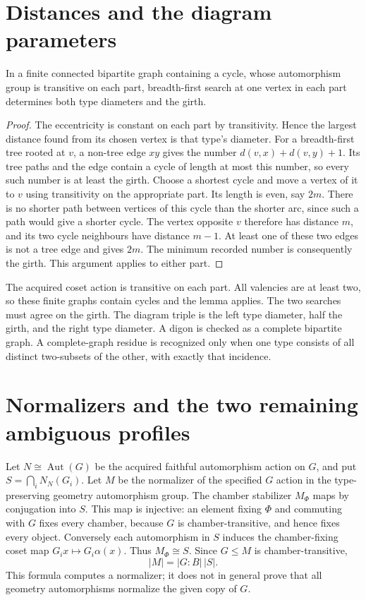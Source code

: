\documentclass[11pt]{article}
\newcommand{\Aut}{\operatorname{Aut}}\newcommand{\HS}{\mathrm{HS}}
\begin{document}
\section*{Distances and the diagram parameters}
\begin{lemma}
In a finite connected bipartite graph containing a cycle, whose automorphism group is
transitive on each part, breadth-first search at one vertex in each
part determines both type diameters and the girth.
\end{lemma}
\begin{proof}
The eccentricity is constant on each part by transitivity. Hence the
largest distance found from its chosen vertex is that type's diameter.
For a breadth-first tree rooted at $v$, a non-tree edge $xy$ gives the
number $d(v,x)+d(v,y)+1$. Its tree paths and the edge contain a cycle
of length at most this number, so every such number is at least the
girth. Choose a shortest cycle and move a vertex of it to $v$ using
transitivity on the appropriate part. Its length is even, say $2m$.
There is no shorter path between vertices of this cycle than the
shorter arc, since such a path would give a shorter cycle. The vertex
opposite $v$ therefore has distance $m$, and its two cycle neighbours
have distance $m-1$. At least one of these two edges is not a tree
edge and gives $2m$. The minimum recorded number is consequently the
girth. This argument applies to either part.
\end{proof}
The acquired coset action is transitive on each part. All valencies
are at least two, so these finite graphs contain cycles and the lemma
applies. The two searches must agree on the girth.
The diagram triple is the left type diameter, half the girth, and the
right type diameter. A digon is checked as a complete bipartite graph.
A complete-graph residue is recognized only when one type consists
of all distinct two-subsets of the other, with exactly that incidence.

\section*{Normalizers and the two remaining ambiguous profiles}
Let $N\cong\Aut(G)$ be the acquired faithful automorphism action on $G$,
and put $S=\bigcap_i N_N(G_i)$. Let $M$ be the normalizer of the
specified $G$ action in the type-preserving geometry automorphism group.
The chamber stabilizer $M_\Phi$ maps by conjugation into $S$.
This map is injective: an element fixing $\Phi$ and commuting with $G$
fixes every chamber, because $G$ is chamber-transitive, and hence fixes
every object. Conversely each automorphism in $S$ induces the
chamber-fixing coset map $G_i x\mapsto G_i\alpha(x)$. Thus
$M_\Phi\cong S$. Since $G\le M$ is chamber-transitive,
\[
                         |M|=|G:B|\,|S|.
\]
This formula computes a normalizer; it does not in general prove that
all geometry automorphisms normalize the given copy of $G$.
\end{document}
